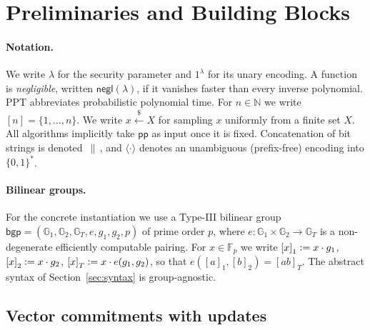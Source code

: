 \documentclass[version=preprint]{iacrcc}
\theoremstyle{definition}
\newcommand{\secpar}{\lambda}
\newcommand{\negl}{\mathsf{negl}}
\newcommand{\PPT}{\mathrm{PPT}}
\newcommand{\bit}{\{0,1\}}
\newcommand{\sample}{\xleftarrow{\;\$\;}}
\newcommand{\defeq}{\vcentcolon=}
\newcommand{\concat}{\,\|\,}
\newcommand{\pp}{\mathsf{pp}}
\newcommand{\GG}{\mathbb{G}}
\newcommand{\FF}{\mathbb{F}}
\newcommand{\gone}[1]{\left[#1\right]_{1}}
\newcommand{\gtwo}[1]{\left[#1\right]_{2}}
\newcommand{\gtt}[1]{\left[#1\right]_{T}}
\begin{document}
\section{Preliminaries and Building Blocks}\label{sec:prelim}

\paragraph{Notation.}
We write $\secpar$ for the security parameter and $1^\secpar$ for its unary
encoding. A function is \emph{negligible}, written $\negl(\secpar)$, if it
vanishes faster than every inverse polynomial. $\PPT$ abbreviates probabilistic
polynomial time. For $n\in\mathbb{N}$ we write $[n]=\{1,\dots,n\}$. We write
$x\sample X$ for sampling $x$ uniformly from a finite set $X$. All algorithms
implicitly take $\pp$ as input once it is fixed. Concatenation of bit strings is
denoted $\concat$, and $\langle\cdot\rangle$ denotes an unambiguous (prefix-free)
encoding into $\bit^{*}$.

\paragraph{Bilinear groups.}
For the concrete instantiation we use a Type-III bilinear group
$\mathsf{bgp}=(\GG_1,\GG_2,\GG_T,e,g_1,g_2,p)$ of prime order $p$, where
$e:\GG_1\times\GG_2\to\GG_T$ is a non-degenerate efficiently computable pairing.
For $x\in\FF_p$ we write $\gone{x}\defeq x\cdot g_1$, $\gtwo{x}\defeq x\cdot g_2$,
$\gtt{x}\defeq x\cdot e(g_1,g_2)$, so that $e(\gone{a},\gtwo{b})=\gtt{ab}$. The
abstract syntax of Section~\ref{sec:syntax} is group-agnostic.

\subsection{Vector commitments with updates}
\end{document}
